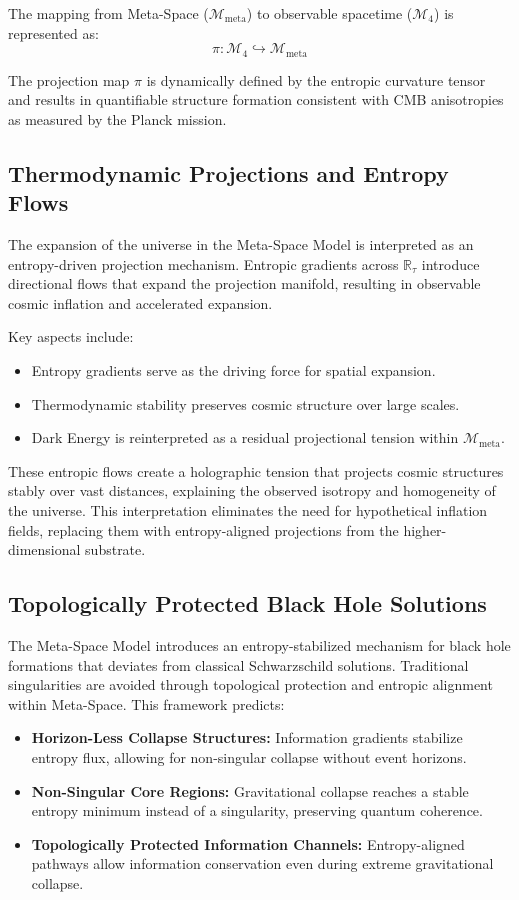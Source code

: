 \documentclass[10.5pt,a4paper]{article}
\begin{document}
The mapping from Meta-Space (\( \mathcal{M}_{\text{meta}} \)) to observable spacetime (\( \mathcal{M}_4 \)) is represented as:
\[
    \pi: \mathcal{M}_4 \hookrightarrow \mathcal{M}_{\text{meta}}
\]

The projection map \( \pi \) is dynamically defined by the entropic curvature tensor and 
results in quantifiable structure formation consistent with CMB anisotropies as measured by the Planck mission.

\subsection{Thermodynamic Projections and Entropy Flows}

The expansion of the universe in the Meta-Space Model is interpreted as an entropy-driven projection mechanism. 
Entropic gradients across \( \mathbb{R}_\tau \) introduce directional flows that expand the projection manifold, 
resulting in observable cosmic inflation and accelerated expansion.

Key aspects include:
\begin{itemize}
    \item Entropy gradients serve as the driving force for spatial expansion.
    \item Thermodynamic stability preserves cosmic structure over large scales.
    \item Dark Energy is reinterpreted as a residual projectional tension within \( \mathcal{M}_{\text{meta}} \).
\end{itemize}

These entropic flows create a holographic tension that projects cosmic structures stably over vast distances, 
explaining the observed isotropy and homogeneity of the universe. This interpretation eliminates the need for 
hypothetical inflation fields, replacing them with entropy-aligned projections from the higher-dimensional substrate.

\subsection{Topologically Protected Black Hole Solutions}

The Meta-Space Model introduces an entropy-stabilized mechanism for black hole formations that deviates from classical 
Schwarzschild solutions. Traditional singularities are avoided through topological protection and entropic alignment 
within Meta-Space. This framework predicts:
\begin{itemize}
    \item \textbf{Horizon-Less Collapse Structures:} Information gradients stabilize entropy flux, allowing for non-singular collapse without event horizons.
    \item \textbf{Non-Singular Core Regions:} Gravitational collapse reaches a stable entropy minimum instead of a singularity, preserving quantum coherence.
    \item \textbf{Topologically Protected Information Channels:} Entropy-aligned pathways allow information conservation even during extreme gravitational collapse.
\end{itemize}
\end{document}
